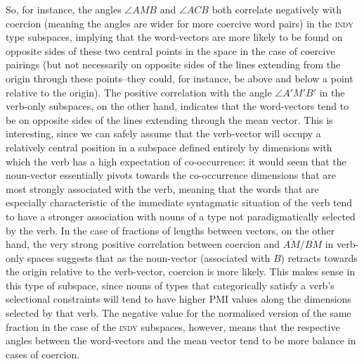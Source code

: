 So, for instance, the angles $\angle AMB$ and $\angle ACB$ both correlate negatively with coercion (meaning the angles are wider for more coercive word pairs) in the \textsc{indy} type subspaces, implying that the word-vectors are more likely to be found on opposite sides of these two central points in the space in the case of coercive pairings (but not necessarily on opposite sides of the lines extending from the origin through these points--they could, for instance, be above and below a point relative to the origin).  The positive correlation with the angle $\angle A'M'B'$ in the verb-only subspaces, on the other hand, indicates that the word-vectors tend to be on opposite sides of the lines extending through the mean vector.  This is interesting, since we can safely assume that the verb-vector will occupy a relatively central position in a subspace defined entirely by dimensions with which the verb has a high expectation of co-occurrence: it would seem that the noun-vector essentially pivots towards the co-occurrence dimensions that are most strongly associated with the verb, meaning that the words that are especially characteristic of the immediate syntagmatic situation of the verb tend to have a stronger association with nouns of a type not paradigmatically selected by the verb.  In the case of fractions of lengths between vectors, on the other hand, the very strong positive correlation between coercion and $\overline{AM}/\overline{BM}$ in verb-only spaces suggests that as the noun-vector (associated with $B$) retracts towards the origin relative to the verb-vector, coercion is more likely.  This makes sense in this type of subspace, since nouns of types that categorically satisfy a verb's selectional constraints will tend to have higher PMI values along the dimensions selected by that verb.  The negative value for the normalised version of the same fraction in the case of the \textsc{indy} subspaces, however, means that the respective angles between the word-vectors and the mean vector tend to be more balance in cases of coercion.

